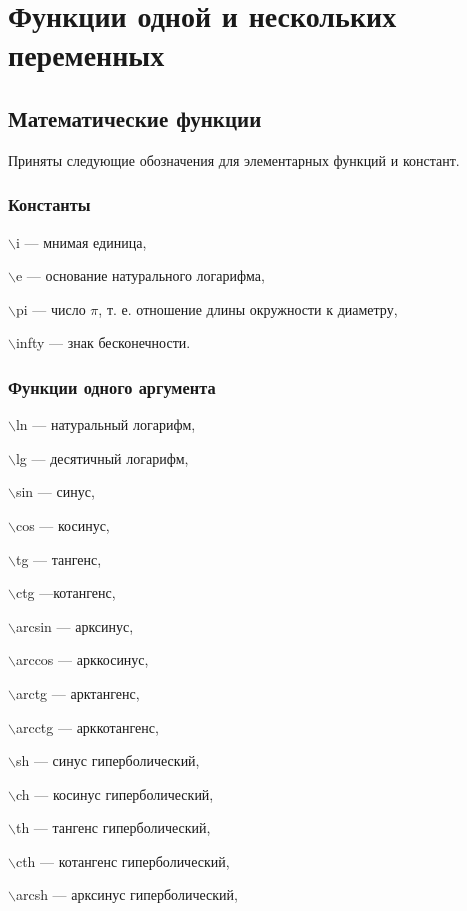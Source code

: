 \chapter{Функции одной и нескольких переменных}

\section{Математические функции}
Приняты следующие обозначения для элементарных функций и констант. 

\subsection{Константы}
\hspace*{4mm}  $\backslash$i --- мнимая единица, 

 $\backslash$e --- основание натурального логарифма, 

 $\backslash$pi --- число $\pi$,  т. е.  отношение длины окружности к диаметру, 

 $\backslash$infty --- знак бесконечности. 


\subsection{Функции одного аргумента}

\hspace*{4mm} $\backslash$ln --- натуральный логарифм, 

 $\backslash$lg --- десятичный логарифм, 

 $\backslash$sin --- синус, 

 $\backslash$cos --- косинус, 

 $\backslash$tg --- тангенс, 

 $\backslash$ctg ---котангенс, 

 $\backslash$arcsin --- арксинус, 

 $\backslash$arccos --- арккосинус, 

 $\backslash$arctg --- арктангенс, 

 $\backslash$arcctg --- арккотангенс, 

 $\backslash$sh --- синус гиперболический, 

 $\backslash$ch --- косинус гиперболический, 

 $\backslash$th --- тангенс гиперболический, 

 $\backslash$cth --- котангенс гиперболический, 

 $\backslash$arcsh --- арксинус гиперболический, 

